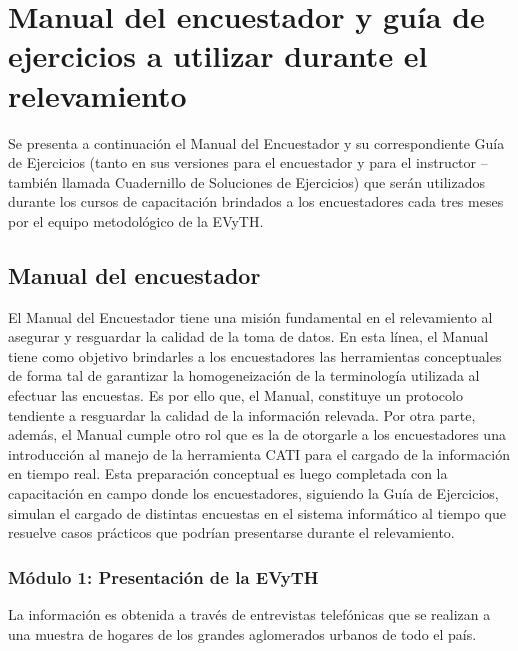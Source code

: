 \documentclass[
  openany]{book}
\begin{document}
\hypertarget{manual-del-encuestador-y-guuxeda-de-ejercicios-a-utilizar-durante-el-relevamiento}{%
\section{Manual del encuestador y guía de ejercicios a utilizar durante el relevamiento}\label{manual-del-encuestador-y-guuxeda-de-ejercicios-a-utilizar-durante-el-relevamiento}}

Se presenta a continuación el Manual del Encuestador y su correspondiente Guía de Ejercicios (tanto en sus versiones para el encuestador y para el instructor --también llamada Cuadernillo de Soluciones de Ejercicios) que serán utilizados durante los cursos de capacitación brindados a los encuestadores cada tres meses por el equipo metodológico de la EVyTH.

\hypertarget{manual-del-encuestador}{%
\subsection{Manual del encuestador}\label{manual-del-encuestador}}

El Manual del Encuestador tiene una misión fundamental en el relevamiento al asegurar y resguardar la calidad de la toma de datos. En esta línea, el Manual tiene como objetivo brindarles a los encuestadores las herramientas conceptuales de forma tal de garantizar la homogeneización de la terminología utilizada al efectuar las encuestas. Es por ello que, el Manual, constituye un protocolo tendiente a resguardar la calidad de la información relevada. Por otra parte, además, el Manual cumple otro rol que es la de otorgarle a los encuestadores una introducción al manejo de la herramienta CATI para el cargado de la información en tiempo real. Esta preparación conceptual es luego completada con la capacitación en campo donde los encuestadores, siguiendo la Guía de Ejercicios, simulan el cargado de distintas encuestas en el sistema informático al tiempo que resuelve casos prácticos que podrían presentarse durante el relevamiento.

\hypertarget{muxf3dulo-1-presentaciuxf3n-de-la-evyth}{%
\subsubsection{Módulo 1: Presentación de la EVyTH}\label{muxf3dulo-1-presentaciuxf3n-de-la-evyth}}

La información es obtenida a través de entrevistas telefónicas que se realizan a una muestra de hogares de los grandes aglomerados urbanos de todo el país.
\end{document}
